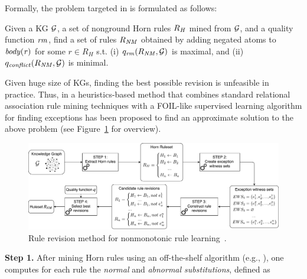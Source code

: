 Formally, the problem targeted in \cite{gad2016,rumis} is formulated as follows: 
\begin{definition} Given a KG $\mathcal{G}$,
a set of nonground Horn rules $R_{\mathit{H}}$ mined from $\mathcal{G}$, and a quality
function $\mathit{rm}$, %
find a set of rules $R_{\mathit{NM}}$ obtained by
adding negated atoms to $\mathit{body(r)}$ for some $r{\in} R_{H}$ s.t. (i)
${q_{\mathit{rm}}(R_{\mathit{NM}},\mathcal{G})}$ is maximal, and (ii)
${q_{\mathit{conflict}}(R_{\mathit{NM}},\mathcal{G})}$ is minimal.
\end{definition}



Given huge size of KGs, finding the best possible revision is unfeasible in practice. Thus, in \cite{gad2016,rumis} a heuristics-based method that combines standard relational association rule mining techniques with a FOIL-like supervised learning algorithm \cite{foil} for finding exceptions has been proposed to find an approximate solution to the above problem (see Figure~\ref{fig:iswc_process} for overview). 

\begin{figure}[t]
\centering
\includegraphics[width=1\textwidth]{figures/overview_new}
\caption{Rule revision method for nonmonotonic rule learning~\cite{gad2016,rumis}.}
\label{fig:iswc_process}
\end{figure}
\noindent \textbf{Step 1.} After mining Horn rules using an off-the-shelf algorithm (e.g.,
 \cite{amie}), %
 one computes for each rule the \emph{normal} and
\emph{abnormal substitutions}, defined as

